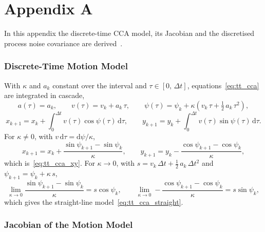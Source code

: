\chapter*{Appendix A}
\label{app:process_noise}

In this appendix the discrete-time CCA model, its Jacobian and the discretised process noise
covariance are derived~\cite{barshalom2001}.

\subsection*{Discrete-Time Motion Model}

With $\kappa$ and $a_k$ constant over the interval and $\tau \in [0,\,\Delta t]$,
equations~\eqref{eq:tt_cca} are integrated in cascade,
\begin{equation}
    a(\tau) = a_k,
    \qquad
    v(\tau) = v_k + a_k\,\tau,
    \qquad
    \psi(\tau) = \psi_k + \kappa\left(v_k\,\tau + \tfrac{1}{2}\,a_k\,\tau^2\right),
    \label{eq:app_psi}
\end{equation}
\begin{equation}
    x_{k+1} = x_k + \int_0^{\Delta t} v(\tau)\cos\psi(\tau)\,\mathrm{d}\tau,
    \qquad
    y_{k+1} = y_k + \int_0^{\Delta t} v(\tau)\sin\psi(\tau)\,\mathrm{d}\tau.
\end{equation}
For $\kappa \neq 0$, with $v\,\mathrm{d}\tau = \mathrm{d}\psi/\kappa$,
\begin{equation}
    x_{k+1} = x_k + \frac{\sin\psi_{k+1} - \sin\psi_k}{\kappa},
    \qquad
    y_{k+1} = y_k - \frac{\cos\psi_{k+1} - \cos\psi_k}{\kappa},
\end{equation}
which is~\eqref{eq:tt_cca_xy}. For $\kappa \to 0$, with
$s = v_k\,\Delta t + \tfrac{1}{2}\,a_k\,\Delta t^2$ and $\psi_{k+1} = \psi_k + \kappa\,s$,
\begin{equation}
    \lim_{\kappa \to 0} \frac{\sin\psi_{k+1} - \sin\psi_k}{\kappa} = s\cos\psi_k,
    \qquad
    \lim_{\kappa \to 0} -\frac{\cos\psi_{k+1} - \cos\psi_k}{\kappa} = s\sin\psi_k,
\end{equation}
which gives the straight-line model~\eqref{eq:tt_cca_straight}.

\subsection*{Jacobian of the Motion Model}

